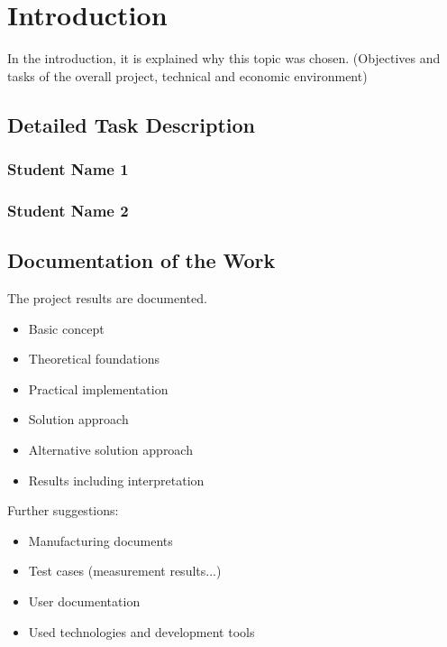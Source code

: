 \chapter{Introduction}

In the introduction, it is explained why this topic was chosen. (Objectives and tasks of the overall project, technical and economic environment)

\section{Detailed Task Description}

\subsection{Student Name 1}

\subsection{Student Name 2}

\section{Documentation of the Work}

The project results are documented.

\begin{itemize}
	\item Basic concept
	\item Theoretical foundations
	\item Practical implementation
	\item Solution approach
	\item Alternative solution approach
	\item Results including interpretation
\end{itemize}

Further suggestions:

\begin{itemize}
	\item Manufacturing documents
	\item Test cases (measurement results...)
	\item User documentation
	\item Used technologies and development tools
\end{itemize}
